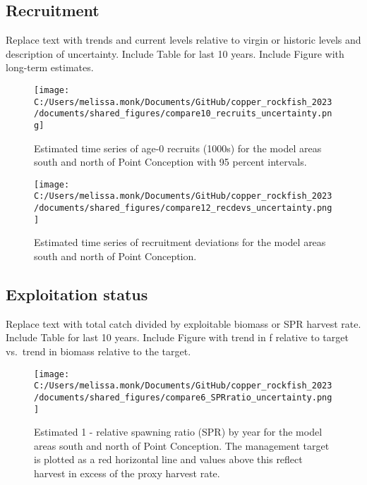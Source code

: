 \documentclass[11pt,
  english,
  letterpaper,
]{article}
\begin{document}
\clearpage

\hypertarget{recruitment}{%
\subsection*{Recruitment}\label{recruitment}}

Replace text with trends and current levels relative to virgin or historic levels and description of uncertainty. Include Table for last 10 years. Include Figure with long-term estimates.





\begin{figure}
\centering
\texttt{[image: C:/Users/melissa.monk/Documents/GitHub/copper\_rockfish\_2023/documents/shared\_figures/compare10\_recruits\_uncertainty.png]}
\caption{Estimated time series of age-0 recruits (1000s) for the model areas south and north of Point Conception with 95 percent intervals.\label{fig:es-recruits}}
\end{figure}

\begin{figure}
\centering
\texttt{[image: C:/Users/melissa.monk/Documents/GitHub/copper\_rockfish\_2023/documents/shared\_figures/compare12\_recdevs\_uncertainty.png]}
\caption{Estimated time series of recruitment deviations for the model areas south and north of Point Conception.\label{fig:es-rec-devs}}
\end{figure}

\clearpage

\hypertarget{exploitation-status}{%
\subsection*{Exploitation status}\label{exploitation-status}}

Replace text with total catch divided by exploitable biomass or SPR harvest rate. Include Table for last 10 years. Include Figure with trend in f relative to target vs.~trend in biomass relative to the target.





\begin{figure}
\centering
\texttt{[image: C:/Users/melissa.monk/Documents/GitHub/copper\_rockfish\_2023/documents/shared\_figures/compare6\_SPRratio\_uncertainty.png]}
\caption{Estimated 1 - relative spawning ratio (SPR) by year for the model areas south and north of Point Conception. The management target is plotted as a red horizontal line and values above this reflect harvest in excess of the proxy harvest rate.\label{fig:es-1-spr}}
\end{figure}
\end{document}
